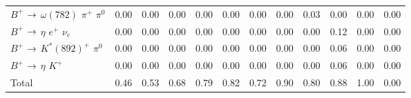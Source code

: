 {\begin{tabular}{lrrrrrrrrrrr}
$B^{+}$ $\rightarrow$ $\omega(782)$ $\pi^{+}$ $\pi^{0}$                      &         0.00 &         0.00 &         0.00 &         0.00 &         0.00 &         0.00 &         0.00 &         0.03 &         0.00 &         0.00 &         0.00 \\
$B^{+}$ $\rightarrow$ $\eta$ $e^{+}$ $\nu_{e}$                               &         0.00 &         0.00 &         0.00 &         0.00 &         0.00 &         0.00 &         0.00 &         0.00 &         0.12 &         0.00 &         0.00 \\
$B^{+}$ $\rightarrow$ $K^{*}(892)^{+}$ $\pi^{0}$                             &         0.00 &         0.00 &         0.00 &         0.00 &         0.00 &         0.00 &         0.00 &         0.00 &         0.06 &         0.00 &         0.00 \\
$B^{+}$ $\rightarrow$ $\eta$ $K^{+}$                                         &         0.00 &         0.00 &         0.00 &         0.00 &         0.00 &         0.00 &         0.00 &         0.00 &         0.06 &         0.00 &         0.00 \\
Total                                                                &         0.46 &         0.53 &         0.68 &         0.79 &         0.82 &         0.72 &         0.90 &         0.80 &         0.88 &         1.00 &         0.00 \\
\hline
\end{tabular}
}